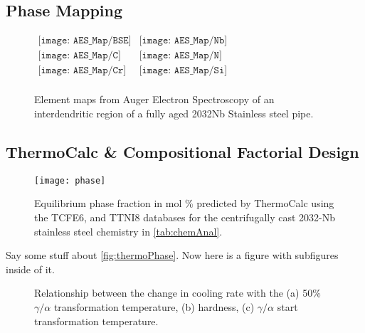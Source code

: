 \documentclass[review, 1p, number, sort&compress,table]{elsarticle}
\begin{document}
	\subsection{Phase Mapping}
	
	\begin{figure*}[ht!]
		\begin{center}$
			\begin{array}{cc}
				\texttt{[image: AES\_Map/BSE]} & \texttt{[image: AES\_Map/Nb]} \\
				\texttt{[image: AES\_Map/C]} & \texttt{[image: AES\_Map/N]} \\
				\texttt{[image: AES\_Map/Cr]} & \texttt{[image: AES\_Map/Si]} \\
			\end{array}$
		\end{center}
		\caption{Element maps from Auger Electron Spectroscopy of an interdendritic region of a fully aged 2032Nb Stainless steel pipe.}
		\label{fig:aesmap}
	\end{figure*}

\subsection{ThermoCalc \&  Compositional Factorial Design}

	\begin{figure}[H]
		\begin{center}
			\texttt{[image: phase]}	
		\end{center}			
		\caption{Equilibrium phase fraction in mol \% predicted by ThermoCalc using the TCFE6, and TTNI8 databases for the centrifugally cast 2032-Nb stainless steel chemistry in \autoref{tab:chemAnal}.}	
			\label{fig:thermoPhase}
	\end{figure}
	
	\indent Say some stuff about \autoref{fig:thermoPhase}. Now here is a figure with subfigures inside of it.
	
\captionsetup[subfigure]{position=top}
\begin{figure*}[ht!]
	\begin{center}
	\end{center}
	\caption{Relationship between the change in cooling rate with the (a) 50\% $\gamma/\alpha$ transformation temperature, (b) hardness, (c) $\gamma/\alpha$ start transformation temperature.}
	\label{fig:hara2008-coolingRate}
\end{figure*}
	
\end{document}
